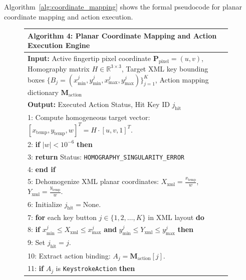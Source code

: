 Algorithm~\ref{alg:coordinate_mapping} shows the formal pseudocode for planar coordinate mapping and action execution.

\begin{figure}[htbp]
\centering
\begin{minipage}{0.92\textwidth}
\small
\setlength{\extrarowheight}{2pt}
\begin{tabular}{|p{0.96\linewidth}|}
\hline
\textbf{Algorithm 4: Planar Coordinate Mapping and Action Execution Engine} \\
\hline
{\small\sffamily \textbf{Input:} Active fingertip pixel coordinate $\mathbf{P}_{\text{pixel}} = (u, v)$, Homography matrix $H \in \mathbb{R}^{3 \times 3}$, Target XML key bounding boxes $\{B_j = (x_{\min}^j, y_{\min}^j, x_{\max}^j, y_{\max}^j)\}_{j=1}^K$, Action mapping dictionary $\mathbf{M}_{\text{action}}$} \\
{\small\sffamily \textbf{Output:} Executed Action Status, Hit Key ID $j_{\text{hit}}$} \\
{\small 1: Compute homogeneous target vector: $[x_{\text{temp}}, y_{\text{temp}}, w]^T = H \cdot [u, v, 1]^T$.} \\
{\small 2: \textbf{if} $|w| < 10^{-6}$ \textbf{then}} \\
{\small 3: \hspace{1em} \textbf{return} Status: \texttt{HOMOGRAPHY\_SINGULARITY\_ERROR}} \\
{\small 4: \textbf{end if}} \\
{\small 5: Dehomogenize XML planar coordinates: $X_{\text{xml}} = \frac{x_{\text{temp}}}{w}$, \hspace{1em} $Y_{\text{xml}} = \frac{y_{\text{temp}}}{w}$.} \\
{\small 6: Initialize $j_{\text{hit}} = \text{None}$.} \\
{\small 7: \textbf{for} each key button $j \in \{1, 2, \dots, K\}$ in XML layout \textbf{do}} \\
{\small 8: \hspace{1em} \textbf{if} $x_{\min}^j \le X_{\text{xml}} \le x_{\max}^j$ \textbf{and} $y_{\min}^j \le Y_{\text{xml}} \le y_{\max}^j$ \textbf{then}} \\
{\small 9: \hspace{2em} Set $j_{\text{hit}} = j$.} \\
{\small 10: \hspace{2em} Extract action binding: $A_j = \mathbf{M}_{\text{action}}[j]$.} \\
{\small 11: \hspace{2em} \textbf{if} $A_j$ is \texttt{KeystrokeAction} \textbf{then}} \\

\end{tabular}
\end{minipage}
\end{figure}
